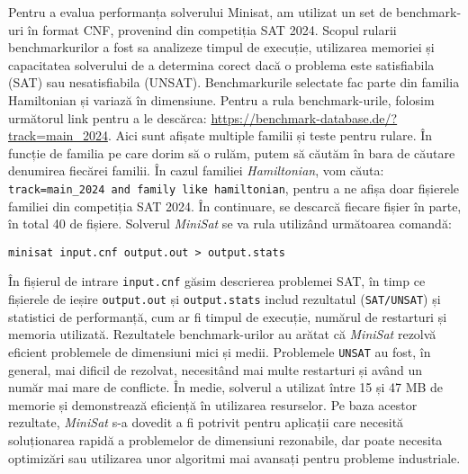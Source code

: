 \documentclass[12pt,a4paper]{report}
\begin{document}
Pentru a evalua performanța solverului Minisat, am utilizat un set de benchmark-uri în format CNF, provenind din competiția SAT 2024. Scopul rularii benchmarkurilor a fost sa analizeze timpul de execuție, utilizarea memoriei și capacitatea solverului de a determina corect dacă o problema este satisfiabila (SAT) sau nesatisfiabila (UNSAT). Benchmarkurile selectate fac parte din familia Hamiltonian și variază în dimensiune.
\newline
\newline
Pentru a rula benchmark-urile, folosim următorul link pentru a le descărca: 
\href{https://benchmark-database.de/?track=main_2024}{https://benchmark-database.de/?track=main\_2024}. 
Aici sunt afișate multiple familii și teste pentru rulare. În funcție de familia pe care dorim să o rulăm, putem să căutăm în bara de căutare denumirea fiecărei familii. În cazul familiei \textit{Hamiltonian}, vom căuta: \texttt{track=main\_2024 and family like hamiltonian}, 
pentru a ne afișa doar fișierele familiei din competiția SAT 2024. 
În continuare, se descarcă fiecare fișier în parte, în total 40 de fișiere.
Solverul \textit{MiniSat} se va rula utilizând următoarea comandă:
\begin{verbatim}minisat input.cnf output.out > output.stats
\end{verbatim}
În fișierul de intrare \texttt{input.cnf} găsim descrierea problemei SAT, în timp ce fișierele de ieșire \texttt{output.out} și \texttt{output.stats} includ rezultatul (\texttt{SAT/UNSAT}) și statistici de performanță, cum ar fi timpul de execuție, numărul de restarturi și memoria utilizată.
\newline
\newline
Rezultatele benchmark-urilor au arătat că \textit{MiniSat} rezolvă eficient problemele de dimensiuni mici și medii. Problemele \texttt{UNSAT} au fost, în general, mai dificil de rezolvat, necesitând mai multe restarturi și având un număr mai mare de conflicte. În medie, solverul a utilizat între 15 și 47 MB de memorie și demonstrează eficiență în utilizarea resurselor.
\newline
Pe baza acestor rezultate, \textit{MiniSat} s-a dovedit a fi potrivit pentru aplicații care necesită soluționarea rapidă a problemelor de dimensiuni rezonabile, dar poate necesita optimizări sau utilizarea unor algoritmi mai avansați pentru probleme industriale.
\end{document}
